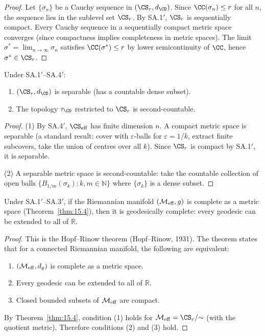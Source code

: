 \begin{proof}
Let $\{\sigma_n\}$ be a Cauchy sequence in $(\CS_r, d_{\CD})$.  Since
$\CC(\sigma_n) \leq r$ for all $n$, the sequence lies in the sublevel
set $\CS_r$.  By SA.1$'$, $\CS_r$ is sequentially compact.  Every Cauchy
sequence in a sequentially compact metric space converges (since
compactness implies completeness in metric spaces).  The limit
$\sigma^* = \lim_{n \to \infty} \sigma_n$ satisfies
$\CC(\sigma^*) \leq r$ by lower semicontinuity of $\CC$, hence
$\sigma^* \in \CS_r$.
\end{proof}

\begin{theorem}\label{thm:15.5}
Under SA.1$'$--SA.4$'$:
\begin{enumerate}
  \item $(\CS_r, d_{\CD})$ is separable (has a countable dense subset).
  \item The topology $\tau_{\CD}$ restricted to $\CS_r$ is
        second-countable.
\end{enumerate}
\end{theorem}

\begin{proof}
(1) By SA.4$'$, $\CS_{\mathrm{eff}}$ has finite dimension $n$.  A
compact metric space is separable (a standard result: cover with
$\varepsilon$-balls for $\varepsilon = 1/k$, extract finite subcovers,
take the union of centres over all $k$).  Since $\CS_r$ is compact
by SA.1$'$, it is separable.

(2) A separable metric space is second-countable: take the countable
collection of open balls $\{B_{1/m}(\sigma_k) : k, m \in \mathbb{N}\}$
where $\{\sigma_k\}$ is a dense subset.
\end{proof}

\begin{theorem}\label{thm:15.6}
Under SA.1$'$--SA.3$'$, if the Riemannian manifold
$(\mathcal{M}_{\mathrm{eff}}, g)$ is complete as a metric space
(Theorem~\ref{thm:15.4}), then it is geodesically complete: every
geodesic can be extended to all of $\mathbb{R}$.
\end{theorem}

\begin{proof}
This is the Hopf--Rinow theorem (Hopf--Rinow, 1931).  The theorem
states that for a connected Riemannian manifold, the following are
equivalent:
\begin{enumerate}
  \item $(\mathcal{M}_{\mathrm{eff}}, d_g)$ is complete as a metric space.
  \item Every geodesic can be extended to all of $\mathbb{R}$.
  \item Closed bounded subsets of $\mathcal{M}_{\mathrm{eff}}$ are compact.
\end{enumerate}
By Theorem~\ref{thm:15.4}, condition (1) holds for
$\CM_{\mathrm{eff}} = \CS_r / {\sim}$ (with the quotient metric).
Therefore conditions (2) and (3) hold.
\end{proof}

